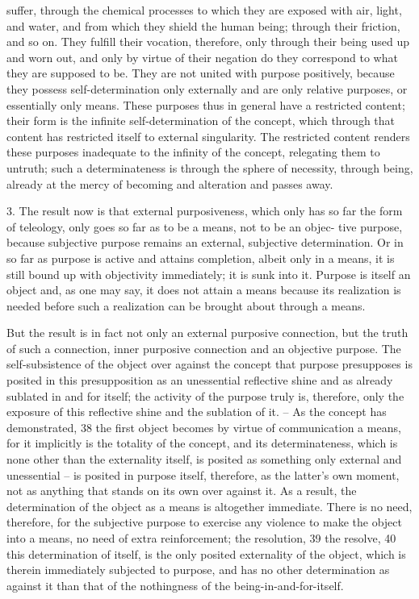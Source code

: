 suffer, through the chemical processes to which they are exposed with air,
light, and water, and from which they shield the human being; through
their friction, and so on. They fulfill their vocation, therefore, only through
their being used up and worn out, and only by virtue of their negation do
they correspond to what they are supposed to be. They are not united with
purpose positively, because they possess self-determination only externally
and are only relative purposes, or essentially only means.
These purposes thus in general have a restricted content; their form is
the infinite self-determination of the concept, which through that content
has restricted itself to external singularity. The restricted content renders
these purposes inadequate to the infinity of the concept, relegating them to
untruth; such a determinateness is through the sphere of necessity, through
being, already at the mercy of becoming and alteration and passes away.

3. The result now is that external purposiveness, which only has so far
the form of teleology, only goes so far as to be a means, not to be an objec-
tive purpose, because subjective purpose remains an external, subjective
determination. Or in so far as purpose is active and attains completion,
albeit only in a means, it is still bound up with objectivity immediately; it
is sunk into it. Purpose is itself an object and, as one may say, it does not
attain a means because its realization is needed before such a realization
can be brought about through a means.

But the result is in fact not only an external purposive connection, but
the truth of such a connection, inner purposive connection and an objective
purpose. The self-subsistence of the object over against the concept that
purpose presupposes is posited in this presupposition as an unessential
reflective shine and as already sublated in and for itself; the activity of the
purpose truly is, therefore, only the exposure of this reflective shine and the
sublation of it. – As the concept has demonstrated, 38 the first object becomes
by virtue of communication a means, for it implicitly is the totality of the
concept, and its determinateness, which is none other than the externality
itself, is posited as something only external and unessential – is posited
in purpose itself, therefore, as the latter's own moment, not as anything
that stands on its own over against it. As a result, the determination of the
object as a means is altogether immediate. There is no need, therefore, for
the subjective purpose to exercise any violence to make the object into a
means, no need of extra reinforcement; the resolution, 39 the resolve, 40 this
determination of itself, is the only posited externality of the object, which is
therein immediately subjected to purpose, and has no other determination
as against it than that of the nothingness of the being-in-and-for-itself.

